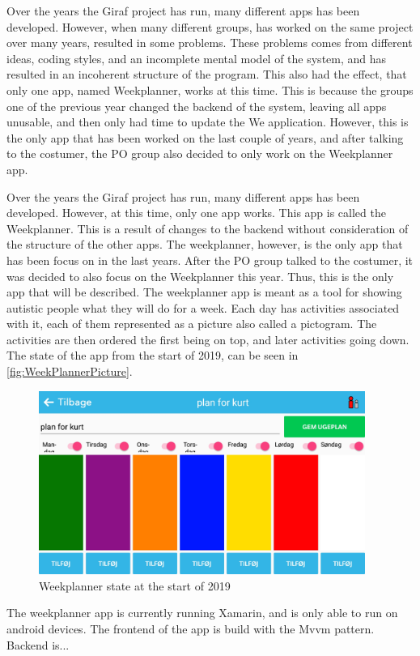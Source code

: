 Over the years the Giraf project has run, many different apps has been developed. However, when many different groups, has worked on the same project over many years,  resulted in some problems. \newline
These problems comes from different ideas, coding styles, and an incomplete mental model of the system, and has resulted in an incoherent structure of the program.  \newline
This also had the effect, that only one app, named Weekplanner, works at this time. This is because the groups one of the previous year changed the backend of the system, leaving all apps unusable, and then only had time to update the We application. \newline
However, this is the only app that has been worked on the last couple of years, and after talking to the costumer, the \gls{PO} group also decided to only work on the Weekplanner app.  \newline 

\par \noindent
Over the years the Giraf project has run, many different apps has been developed. However, at this time, only one app works. This app is called the Weekplanner. This is a result of changes to the backend without consideration of the structure of the other apps\cite{AppsStatus2019}.  \newline
The weekplanner, however, is the only app that has been focus on in the last years. After the \gls{PO} group talked to the costumer, it was decided to also focus on the Weekplanner this year. Thus, this is the only app that will be described.  \newline
The weekplanner app is meant as a tool for showing autistic people what they will do for a week. Each day has activities associated with it, each of them represented as a picture also called a pictogram. The activities are then ordered the first being on top, and later activities going down. The state of the app from the start of 2019, can be seen in \autoref{fig:WeekPlannerPicture}.

\begin{figure}[ht]
        \begin{center}
            \includegraphics[width=0.95\textwidth]{figures/WeekPlannerPicture}
        \end{center}
        \caption{Weekplanner state at the start of 2019}
        \label{fig:WeekPlannerPicture}
\end{figure}

\noindent
The weekplanner app is currently running Xamarin, and is only able to run on android devices. The frontend of the app is build with the \gls{Mvvm} pattern. 
Backend is... %
